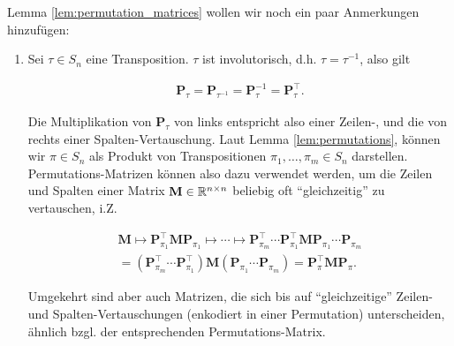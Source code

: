             \begin{remark} \label{rem:permutation_matrices}

                Lemma \ref{lem:permutation_matrices} wollen wir noch ein paar Anmerkungen hinzufügen:

                \begin{enumerate}[
                    label = \arabic*.,
                    wide,
                    labelindent = 0pt
                ]

                    \item Sei $\tau \in S_n$ eine Transposition.
                    $\tau$ ist involutorisch, d.h. $\tau = \tau^{-1}$, also gilt

                    \begin{align*}
                        \mathbf P_\tau
                        =
                        \mathbf P_{\tau^{-1}}
                        =
                        \mathbf P_\tau^{-1}
                        =
                        \mathbf P_\tau^\top.
                    \end{align*}

                    Die Multiplikation von $\mathbf P_\tau$ von links entspricht also einer Zeilen-, und die von rechts einer Spalten-Vertauschung.
                    Laut Lemma \ref{lem:permutations}, können wir $\pi \in S_n$ als Produkt von Transpositionen $\pi_1, \dots, \pi_m \in S_n$ darstellen.
                    Permutations-Matrizen können also dazu verwendet werden, um die Zeilen und Spalten einer Matrix $\mathbf M \in \mathbb R^{n \times n}$ beliebig oft \enquote{gleichzeitig} zu vertauschen, i.Z.

                    \begin{multline*}
                        \mathbf M
                        \mapsto
                        \mathbf P_{\pi_1}^\top \mathbf M \mathbf P_{\pi_1}
                        \mapsto
                        \cdots
                        \mapsto
                        \mathbf P_{\pi_m}^\top \cdots \mathbf P_{\pi_1}^\top \mathbf M \mathbf P_{\pi_1} \cdots \mathbf P_{\pi_m} \\
                        =
                        (\mathbf P_{\pi_m}^\top \cdots \mathbf P_{\pi_1}^\top) \mathbf M (\mathbf P_{\pi_1} \cdots \mathbf P_{\pi_m})
                        =
                        \mathbf P_\pi^\top \mathbf M \mathbf P_\pi.
                    \end{multline*}

                    Umgekehrt sind aber auch Matrizen, die sich bis auf \enquote{gleichzeitige} Zeilen- und Spalten-Vertauschungen (enkodiert in einer Permutation) unterscheiden, ähnlich bzgl. der entsprechenden Permutations-Matrix.


\end{enumerate}
\end{remark}
